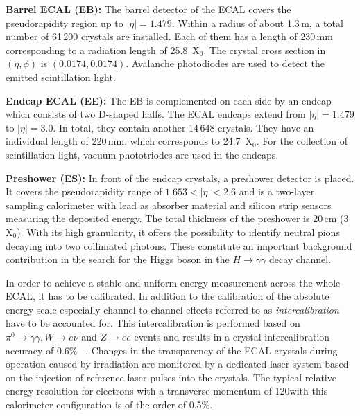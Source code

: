 \begin{description}
 \item \textbf{Barrel ECAL (EB):} The barrel detector of the ECAL covers the pseudorapidity region up to $|\eta| = 1.479$. Within a radius of about 1.3\,m, a total number of 61\,200 crystals are installed. Each of them has a length of 230\,mm corresponding to a radiation length of 25.8~$\mathrm{X_0}$. The crystal cross section in $(\eta, \phi)$ is $(0.0174, 0.0174)$. Avalanche photodiodes are used to detect the emitted scintillation light.
 \item \textbf{Endcap ECAL (EE):} The EB is complemented on each side by an endcap which consists of two D-shaped halfs. The ECAL endcaps extend from $|\eta| = 1.479$ to $|\eta| = 3.0$. In total, they contain another 14\,648 crystals. They have an individual length of 220\,mm, which corresponds to 24.7~$\mathrm{X}_0$. For the collection of scintillation light, vacuum phototriodes are used in the endcaps.
 \item \textbf{Preshower (ES):} In front of the endcap crystals, a preshower detector is placed. It covers the pseudorapidity range of $1.653 < |\eta| <2.6$ and is a two-layer sampling calorimeter with lead as absorber material and silicon strip sensors measuring the deposited energy. The total thickness of the preshower is 20\,cm (3~$\mathrm{X_0}$). With its high granularity, it offers the possibility to identify neutral pions decaying into two collimated photons. These constitute an important background contribution in the search for the Higgs boson in the $H \rightarrow \gamma \gamma$ decay channel.
\end{description}
In order to achieve a stable and uniform energy measurement across the whole ECAL, it has to be calibrated. In addition to the calibration of the absolute energy scale especially channel-to-channel effects referred to as \textit{intercalibration} have to be accounted for. This intercalibration is performed based on $\pi^0 \rightarrow \gamma \gamma, W \rightarrow e\nu$ and $Z \rightarrow ee$ events and results in a crystal-intercalibration accuracy of 0.6\% ~\cite{CMS-PAS-EGM-10-003}. Changes in the transparency of the ECAL crystals during operation caused by irradiation are monitored by a dedicated laser system based on the injection of reference laser pulses into the crystals. The typical relative energy resolution for electrons with a transverse momentum of 120\gev with this calorimeter configuration is of the order of 0.5\%.

